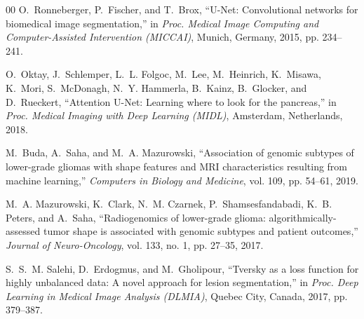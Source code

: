 \documentclass[conference]{IEEEtran}
\begin{document}
\begin{thebibliography}{00}
O.~Ronneberger, P.~Fischer, and T.~Brox, ``U-Net: Convolutional networks for biomedical image segmentation,'' in \emph{Proc. Medical Image Computing and Computer-Assisted Intervention (MICCAI)}, Munich, Germany, 2015, pp. 234--241.

O.~Oktay, J.~Schlemper, L.~L. Folgoc, M.~Lee, M.~Heinrich, K.~Misawa, K.~Mori, S.~McDonagh, N.~Y. Hammerla, B.~Kainz, B.~Glocker, and D.~Rueckert, ``Attention U-Net: Learning where to look for the pancreas,'' in \emph{Proc. Medical Imaging with Deep Learning (MIDL)}, Amsterdam, Netherlands, 2018.

M.~Buda, A.~Saha, and M.~A. Mazurowski, ``Association of genomic subtypes of lower-grade gliomas with shape features and MRI characteristics resulting from machine learning,'' \emph{Computers in Biology and Medicine}, vol. 109, pp. 54--61, 2019.

M.~A. Mazurowski, K.~Clark, N.~M. Czarnek, P.~Shamsesfandabadi, K.~B. Peters, and A.~Saha, ``Radiogenomics of lower-grade glioma: algorithmically-assessed tumor shape is associated with genomic subtypes and patient outcomes,'' \emph{Journal of Neuro-Oncology}, vol. 133, no. 1, pp. 27--35, 2017.

S.~S.~M. Salehi, D.~Erdogmus, and M.~Gholipour, ``Tversky as a loss function for highly unbalanced data: A novel approach for lesion segmentation,'' in \emph{Proc. Deep Learning in Medical Image Analysis (DLMIA)}, Quebec City, Canada, 2017, pp. 379--387.
\end{thebibliography}
\end{document}
